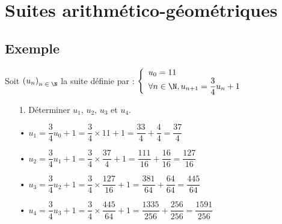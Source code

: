 \ifdefined\COMPLETE
\else
    
    
\fi


\vspace*{-1.5cm}

\section{Suites arithmético-géométriques}

\subsection{Exemple }

Soit $\left(u_n\right)_{n\; \in \; \N}$ la suite définie par : $\left\{
  \begin{array}{lll}
    u_0 = 11 \\
    \forall n \in \N, u_{n+1} = \dfrac{3}{4}u_n + 1
  \end{array}
\right.$

\vspace*{.3cm}

\begin{itemize}
\item[1.] Déterminer $u_1$, $u_2$, $u_3$ et $u_4$. \\
\end{itemize}

\begin{itemize}
\item[•] $u_1 = \dfrac{3}{4}u_0 + 1 = \dfrac{3}{4} \times 11 + 1 = \dfrac{33}{4} + \dfrac{4}{4} = \dfrac{37}{4}$ \vspace*{.3cm} \\
\item[•] $u_2 = \dfrac{3}{4}u_1 + 1 = \dfrac{3}{4} \times \dfrac{37}{4} + 1 = \dfrac{111}{16} + \dfrac{16}{16} = \dfrac{127}{16}$ \vspace*{.3cm} \\
\item[•] $u_3 = \dfrac{3}{4}u_2 + 1 = \dfrac{3}{4} \times \dfrac{127}{16} + 1 = \dfrac{381}{64} + \dfrac{64}{64} = \dfrac{445}{64}$ \vspace*{.3cm} \\
\item[•] $u_4 = \dfrac{3}{4}u_3 + 1 = \dfrac{3}{4} \times \dfrac{445}{64} + 1 = \dfrac{1335}{256} + \dfrac{256}{256} = \dfrac{1591}{256}$ \vspace*{.3cm} \\
\end{itemize}

